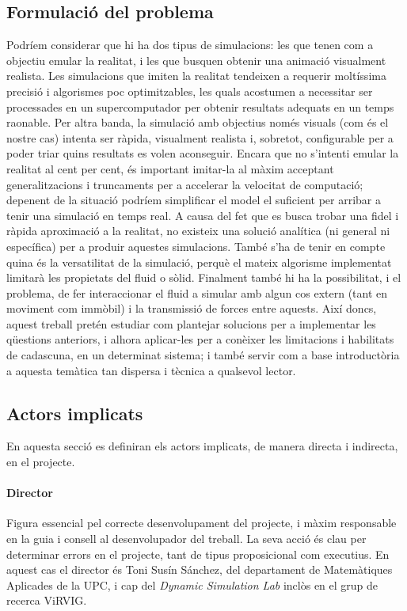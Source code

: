 \documentclass[a4paper]{report}
\begin{document}
	\subsection{Formulació del problema}
	Podríem considerar que hi ha dos tipus de simulacions: les que tenen com a objectiu emular la realitat, i les que busquen obtenir una animació visualment realista.\newline
	Les simulacions que imiten la realitat tendeixen a requerir moltíssima precisió i algorismes poc optimitzables, les quals acostumen a necessitar ser processades en un supercomputador per obtenir resultats adequats en un temps raonable. \newline
	Per altra banda, la simulació amb objectius només visuals (com és el nostre cas) intenta ser ràpida, visualment realista i, sobretot, configurable per a poder triar quins resultats es volen aconseguir. Encara que no s'intenti emular la realitat al cent per cent, és important imitar-la al màxim acceptant generalitzacions i truncaments per a accelerar la velocitat de computació; depenent de la situació podríem simplificar el model el suficient per arribar a tenir una simulació en temps real.\newline
	A causa del fet que es busca trobar una fidel i ràpida aproximació a la realitat, no existeix una solució analítica (ni general ni específica) per a produir aquestes simulacions. També s'ha de tenir en compte quina és la versatilitat de la simulació, perquè el mateix algorisme implementat limitarà les propietats del fluid o sòlid. Finalment també hi ha la possibilitat, i el problema, de fer interaccionar el fluid a simular amb algun cos extern (tant en moviment com immòbil) i la transmissió de forces entre aquests. \newline
	Així doncs, aquest treball pretén estudiar com plantejar solucions per a implementar les qüestions anteriors, i alhora aplicar-les per a conèixer les limitacions i habilitats de cadascuna, en un determinat sistema; i també servir com a base introductòria a aquesta temàtica tan dispersa i tècnica a qualsevol lector.
	
	\subsection{Actors implicats}
	En aquesta secció es definiran els actors implicats, de manera directa i indirecta, en el projecte.
	\paragraph{Director} Figura essencial pel correcte desenvolupament del projecte, i màxim responsable en la guia i consell al desenvolupador del treball. La seva acció és clau per determinar errors en el projecte, tant de tipus proposicional com executius. En aquest cas el director és Toni Susín Sánchez, del departament de Matemàtiques Aplicades de la UPC, i cap del \textit{Dynamic Simulation Lab} inclòs en el grup de recerca ViRVIG.
\end{document}
